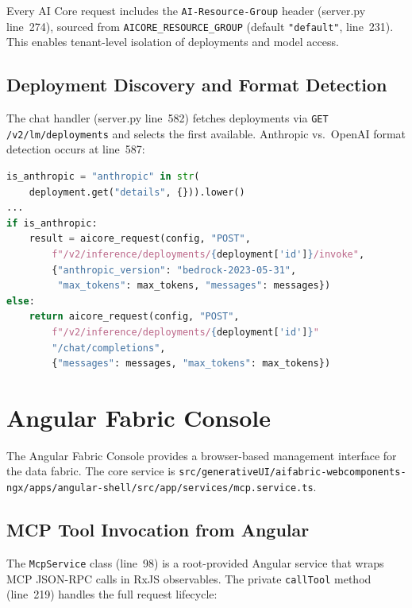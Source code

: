 \documentclass[11pt]{article}
\newcommand{\filepath}[1]{\texttt{#1}}
\newcommand{\code}[1]{\texttt{#1}}
\begin{document}
Every AI Core request includes the \code{AI-Resource-Group} header
(server.py line~274), sourced from \code{AICORE\_RESOURCE\_GROUP}
(default \code{"default"}, line~231).  This enables tenant-level
isolation of deployments and model access.

\subsection{Deployment Discovery and Format Detection}

The chat handler (server.py line~582) fetches deployments via
\code{GET /v2/lm/deployments} and selects the first available.
Anthropic vs.\ OpenAI format detection occurs at line~587:

\begin{lstlisting}[language=Python,caption={Format detection (server.py lines 587--596)},label=lst:format-detect]
is_anthropic = "anthropic" in str(
    deployment.get("details", {})).lower()
...
if is_anthropic:
    result = aicore_request(config, "POST",
        f"/v2/inference/deployments/{deployment['id']}/invoke",
        {"anthropic_version": "bedrock-2023-05-31",
         "max_tokens": max_tokens, "messages": messages})
else:
    return aicore_request(config, "POST",
        f"/v2/inference/deployments/{deployment['id']}"
        "/chat/completions",
        {"messages": messages, "max_tokens": max_tokens})
\end{lstlisting}


\section{Angular Fabric Console}
\label{sec:angular-console}

The Angular Fabric Console provides a browser-based management interface
for the data fabric.  The core service is
\filepath{src/generativeUI/aifabric-webcomponents-ngx/apps/angular-shell/src/app/services/mcp.service.ts}.

\subsection{MCP Tool Invocation from Angular}

The \code{McpService} class (line~98) is a root-provided Angular service
that wraps MCP JSON-RPC calls in RxJS observables.  The private
\code{callTool} method (line~219) handles the full request lifecycle:
\end{document}
